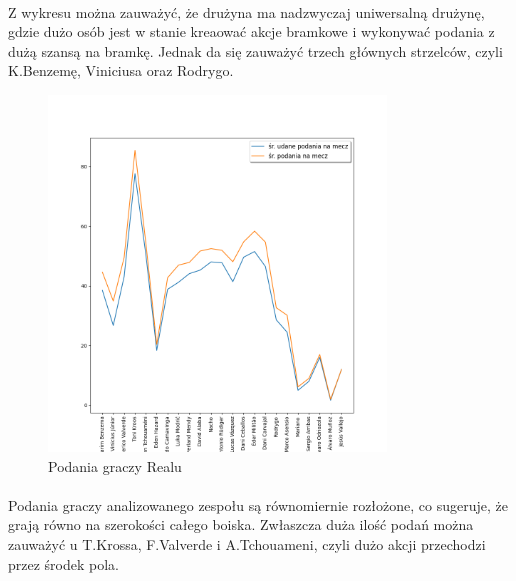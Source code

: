 \documentclass[12pt, letterpaper]{article}
\begin{document}
\paragraph{} Z wykresu można zauważyć, że drużyna ma nadzwyczaj uniwersalną drużynę, gdzie dużo osób jest w stanie kreaować akcje bramkowe i wykonywać podania z dużą szansą na bramkę. Jednak da się zauważyć trzech głównych strzelców, czyli K.Benzemę, Viniciusa oraz Rodrygo.
\pagebreak
\begin{figure}[ht]
    \centering
    \includegraphics[width=0.8\textwidth]{images/Real_passes.png}
    \caption{Podania graczy Realu}
    \label{fig:enter-label}
\end{figure}
\paragraph{} Podania graczy analizowanego zespołu są równomiernie rozłożone, co sugeruje, że grają równo na szerokości całego boiska. Zwłaszcza duża ilość podań można zauważyć u T.Krossa, F.Valverde i A.Tchouameni, czyli dużo akcji przechodzi przez środek pola.
\pagebreak
\end{document}
